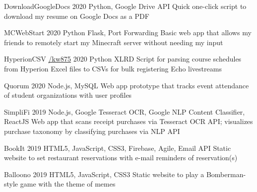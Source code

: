 

\begin{cvprojects}
  \cvproject
  {DownloadGoogleDocs} %
  {\href{https://github.com/KevinIsMyName/DownloadGoogleDocs}{\faGithubSquare\acvHeaderIconSep\@KevinIsMyName}} %
  {2020} %
  {Python, Google Drive API} %
  {Quick one-click script to download my resume on Google Docs as a PDF}

  \cvproject
  {MCWebStart} %
  {\href{https://github.com/KevinIsMyName/MCWebStart}{\faGithubSquare\acvHeaderIconSep\@KevinIsMyName}} %
  {2020} %
  {Python Flask, Port Forwarding} %
  {Basic web app that allows my friends to remotely start my Minecraft server without needing my input}

  \cvproject
  {HyperionCSV}
  {\href{https://github.com/KevinIsMyName/HyperionCSV}{\faGithubSquare\acvHeaderIconSep\@KevinIsMyName/kw875}}
  {2020}
  {Python XLRD}
  {Script for parsing course schedules from Hyperion Excel files to CSVs for bulk registering Echo livestreams}

  \cvproject
  {Quorum}
  {\href{https://github.com/KevinIsMyName/Quorum}{\faGithubSquare\acvHeaderIconSep\@KevinIsMyName}}
  {2020}
  {Node.js, MySQL}
  {Web app prototype that tracks event attendance of student organizations with user profiles}

  \cvproject
  {SimpliFi}
  {\href{https://github.com/unitehenry/simply-finance}{\faGithubSquare\acvHeaderIconSep{}}}
  {2019}
  {Node.js, Google Tesseract OCR, Google NLP Content Classifier, ReactJS}
  {Web app that scans receipt purchases via Tesseract OCR API; visualizes purchase taxonomy by classifying purchases via NLP API}

  \cvproject
  {BookIt}
  {\href{https://github.com/KevinIsMyName/BookIt}{\faGithubSquare\acvHeaderIconSep{}}}
  {2019}
  {HTML5, JavaScript, CSS3, Firebase, Agile, Email API}
  {Static website to set restaurant reservations with e-mail reminders of reservation(s)}

  \cvproject
  {Balloono}
  {\href{https://github.com/KevinIsMyName/Balloono}{\faGithubSquare\acvHeaderIconSep\@KevinIsMyName}}
  {2019}
  {HTML5, JavaScript, CSS3}
  {Static website to play a Bomberman-style game with the theme of memes}
\end{cvprojects}
